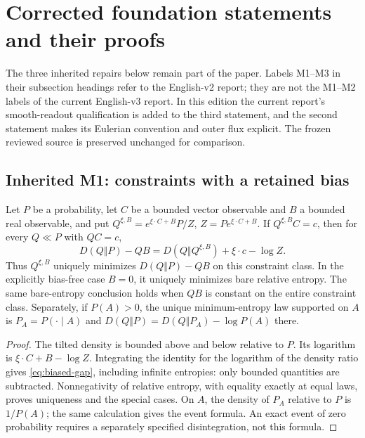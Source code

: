 \section{Corrected foundation statements and their proofs}\label{app:repairs}
The three inherited repairs below remain part of the paper. Labels M1--M3
in their subsection headings refer to the English-v2 report; they are not
the M1--M2 labels of the current English-v3 report. In this edition the
current report's smooth-readout qualification is added to the third statement,
and the second statement makes its Eulerian convention and outer flux explicit.
The frozen reviewed source is preserved unchanged for comparison.

\subsection{Inherited M1: constraints with a retained bias}
\begin{proposition}\label{prop:biased}
Let $P$ be a probability, let $C$ be a bounded vector observable and $B$ a
bounded real observable, and put
$Q^{\xi,B}=e^{\xi\cdot C+B}P/Z$, $Z=P e^{\xi\cdot C+B}$.
If $Q^{\xi,B}C=c$, then for every $Q\ll P$ with $QC=c$,
\begin{equation}
 D(Q\Vert P)-QB=D(Q\Vert Q^{\xi,B})+\xi\cdot c-\log Z.
 \label{eq:biased-gap}
\end{equation}
Thus $Q^{\xi,B}$ uniquely minimizes $D(Q\Vert P)-QB$ on this constraint
class. In the explicitly bias-free case $B=0$, it uniquely minimizes bare
relative entropy. The same bare-entropy conclusion holds when $QB$ is
constant on the entire constraint class. Separately, if $P(A)>0$, the
unique minimum-entropy law supported on $A$ is $P_A=P(\cdot\mid A)$ and
$D(Q\Vert P)=D(Q\Vert P_A)-\log P(A)$ there.
\end{proposition}
\begin{proof}
The tilted density is bounded above and below relative to $P$. Its logarithm
is $\xi\cdot C+B-\log Z$. Integrating the identity for the logarithm of the
density ratio gives \eqref{eq:biased-gap}, including infinite entropies:
only bounded quantities are subtracted. Nonnegativity of relative entropy,
with equality exactly at equal laws, proves uniqueness and the special
cases. On $A$, the density of $P_A$ relative to $P$ is $1/P(A)$; the same
calculation gives the event formula. An exact event of zero probability
requires a separately specified disintegration, not this formula.
\end{proof}

